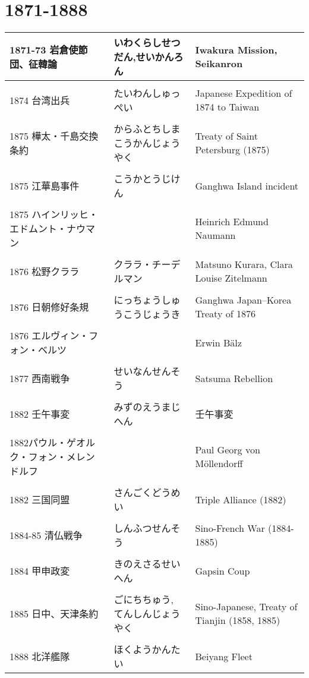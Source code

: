 \documentclass{article}
\begin{document}
\section{1871-1888}
\begin{tabular}{p{4.5cm} | p{4.5cm} | p{10.5cm}}
1871-73 岩倉使節団、征韓論 & いわくらしせつだん,せいかんろん & Iwakura Mission, Seikanron \\ \hline \\[-1em]
1874 台湾出兵 & たいわんしゅっぺい & Japanese Expedition of 1874 to Taiwan \\ \hline \\[-1em]
1875 樺太・千島交換条約 & からふとちしまこうかんじょうやく & Treaty of Saint Petersburg (1875) \\ \hline \\[-1em]
1875 江華島事件 & こうかとうじけん & Ganghwa Island incident \\ \hline \\[-1em]
1875 ハインリッヒ・エドムント・ナウマン & & Heinrich Edmund Naumann \\ \hline \\[-1em]
1876 松野クララ & クララ・チーデルマン & Matsuno Kurara, Clara Louise Zitelmann \\ \hline \\[-1em]
1876 日朝修好条規 & にっちょうしゅうこうじょうき & Ganghwa Japan–Korea Treaty of 1876 \\ \hline \\[-1em]
1876 エルヴィン・フォン・ベルツ & & Erwin Bälz \\ \hline \\[-1em]
1877 西南戦争 & せいなんせんそう & Satsuma Rebellion \\ \hline \\[-1em]
1882 壬午事変 & みずのえうまじへん & 壬午事変 \\ \hline \\[-1em]
1882パウル・ゲオルク・フォン・メレンドルフ & & Paul Georg von Möllendorff \\ \hline \\[-1em]
1882 三国同盟 &  さんごくどうめい & Triple Alliance (1882) \\ \hline \\[-1em]
1884-85 清仏戦争 & しんふつせんそう & Sino-French War (1884-1885) \\ \hline \\[-1em]
1884 甲申政変 & きのえさるせいへん & Gapsin Coup \\ \hline \\[-1em]
1885 日中、天津条約 & ごにちちゅう, てんしんじょうやく & Sino-Japanese, Treaty of Tianjin (1858, 1885) \\ \hline \\[-1em]
1888 北洋艦隊 & ほくようかんたい & Beiyang Fleet
\end{tabular}
\end{document}

